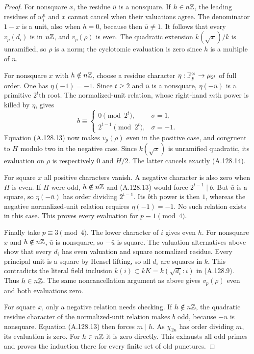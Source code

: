 \begin{proof}
For nonsquare $x$, the residue $\bar u$ is a nonsquare.
If $h\in n\mathbb Z$, the leading residues of $w_i^n$ and $x$
cannot cancel when their valuations agree.
The denominator $1-x$ is a unit, also when $h=0$,
because then $\bar u\ne1$.
It follows that every $v_p(d_i)$ is in $n\mathbb Z$, and
$v_p(\rho)$ is even.
The quadratic extension $k(\sqrt x)/k$ is unramified,
so $\rho$ is a norm; the cyclotomic evaluation is zero
since $h$ is a multiple of $n$.

For nonsquare $x$ with $h\notin n\mathbb Z$, choose a residue
character $\eta:\mathbb F_p^\times\to\mu_{2^t}$ of full order.
One has $\eta(-1)=-1$.
Since $t\ge2$ and $\bar u$ is a nonsquare,
$\eta(-\bar u)$ is a primitive $2^t$th root.
The normalized-unit relation, whose right-hand
$m$th power is killed by $\eta$, gives
\[
 b\equiv
 \begin{cases}
 0\pmod{2^t},&\sigma=1,\\
 2^{t-1}\pmod{2^t},&\sigma=-1.
 \end{cases}
\tag{A.128.15}
\]
Equation (A.128.13) now makes $v_p(\rho)$ even in
the positive case, and congruent to $H$ modulo two
in the negative case.
Since $k(\sqrt x)$ is unramified quadratic, its
evaluation on $\rho$ is respectively $0$ and $H/2$.
The latter cancels exactly (A.128.14).

For square $x$ all positive characters vanish.
A negative character is also zero when $H$ is even.
If $H$ were odd, $h\notin n\mathbb Z$ and (A.128.13)
would force $2^{t-1}\mid b$.
But $\bar u$ is a square, so $\eta(-\bar u)$ has order
dividing $2^{t-1}$.
Its $b$th power is then $1$, whereas the negative
normalized-unit relation requires $\eta(-1)=-1$.
No such relation exists in this case.
This proves every evaluation for $p\equiv1\pmod4$.

Finally take $p\equiv3\pmod4$.
The lower character of $i$ gives even $h$.
For nonsquare $x$ and $h\notin n\mathbb Z$, $\bar u$ is
nonsquare, so $-\bar u$ is square.
The valuation alternatives above show that every $d_i$
has even valuation and square normalized residue.
Every principal unit is a square by Hensel lifting,
so all $d_i$ are squares in $k$.
This contradicts the literal field inclusion
$k(i)\subset kK=k(\sqrt{d_i}:i)$ in (A.128.9).
Thus $h\in n\mathbb Z$.
The same noncancellation argument as above gives
$v_p(\rho)$ even and both evaluations zero.

For square $x$, only a negative relation needs checking.
If $h\notin n\mathbb Z$, the quadratic residue character of
the normalized-unit relation makes $b$ odd,
because $-\bar u$ is nonsquare.
Equation (A.128.13) then forces $m\mid h$.
As $\chi_{2n}$ has order dividing $m$, its evaluation
is zero.  For $h\in n\mathbb Z$ it is zero directly.
This exhausts all odd primes and proves the induction
there for every finite set of old punctures.


\end{proof}
